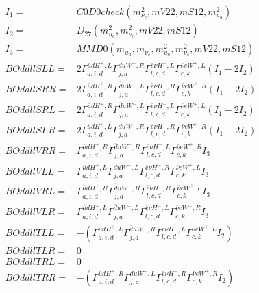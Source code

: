 \documentclass[A4,landscape]{article}
\begin{document}
\begin{align} 
I_1 = & C0D0check(m^2_{\nu_{{c}}}, mV22, mS12, m^2_{u_{{a}}}) \\ 
I_2 = & D_{27}(m^2_{u_{{a}}}, m^2_{\nu_{{c}}}, mV22, mS12) \\ 
I_3 = & MMD0(m_{u_{{a}}}, m_{\nu_{{c}}}, m^2_{u_{{a}}}, m^2_{\nu_{{c}}}, mV22, mS12) \\ 
  BOddllSLL= & 2  \Gamma^{\bar{u}d H^+,L}_{a, i, d} \Gamma^{\bar{d}u W^- ,R}_{j, a} \Gamma^{\bar{e}\nu H^- ,L}_{l, c, d} \Gamma^{\bar{\nu}e W^+,L}_{c, k} (I_1 - 2 I_2) \\ 
  BOddllSRR= & 2  \Gamma^{\bar{u}d H^+,R}_{a, i, d} \Gamma^{\bar{d}u W^- ,L}_{j, a} \Gamma^{\bar{e}\nu H^- ,R}_{l, c, d} \Gamma^{\bar{\nu}e W^+,R}_{c, k} (I_1 - 2 I_2) \\ 
  BOddllSRL= & 2  \Gamma^{\bar{u}d H^+,R}_{a, i, d} \Gamma^{\bar{d}u W^- ,L}_{j, a} \Gamma^{\bar{e}\nu H^- ,L}_{l, c, d} \Gamma^{\bar{\nu}e W^+,L}_{c, k} (I_1 - 2 I_2) \\ 
  BOddllSLR= & 2  \Gamma^{\bar{u}d H^+,L}_{a, i, d} \Gamma^{\bar{d}u W^- ,R}_{j, a} \Gamma^{\bar{e}\nu H^- ,R}_{l, c, d} \Gamma^{\bar{\nu}e W^+,R}_{c, k} (I_1 - 2 I_2) \\ 
  BOddllVRR= &  \Gamma^{\bar{u}d H^+,R}_{a, i, d} \Gamma^{\bar{d}u W^- ,R}_{j, a} \Gamma^{\bar{e}\nu H^- ,L}_{l, c, d} \Gamma^{\bar{\nu}e W^+,R}_{c, k} I_3 \\ 
  BOddllVLL= &  \Gamma^{\bar{u}d H^+,L}_{a, i, d} \Gamma^{\bar{d}u W^- ,L}_{j, a} \Gamma^{\bar{e}\nu H^- ,R}_{l, c, d} \Gamma^{\bar{\nu}e W^+,L}_{c, k} I_3 \\ 
  BOddllVRL= &  \Gamma^{\bar{u}d H^+,R}_{a, i, d} \Gamma^{\bar{d}u W^- ,R}_{j, a} \Gamma^{\bar{e}\nu H^- ,R}_{l, c, d} \Gamma^{\bar{\nu}e W^+,L}_{c, k} I_3 \\ 
  BOddllVLR= &  \Gamma^{\bar{u}d H^+,L}_{a, i, d} \Gamma^{\bar{d}u W^- ,L}_{j, a} \Gamma^{\bar{e}\nu H^- ,L}_{l, c, d} \Gamma^{\bar{\nu}e W^+,R}_{c, k} I_3 \\ 
  BOddllTLL= & -( \Gamma^{\bar{u}d H^+,L}_{a, i, d} \Gamma^{\bar{d}u W^- ,R}_{j, a} \Gamma^{\bar{e}\nu H^- ,L}_{l, c, d} \Gamma^{\bar{\nu}e W^+,L}_{c, k} I_2) \\ 
  BOddllTLR= & 0 \\ 
  BOddllTRL= & 0 \\ 
  BOddllTRR= & -( \Gamma^{\bar{u}d H^+,R}_{a, i, d} \Gamma^{\bar{d}u W^- ,L}_{j, a} \Gamma^{\bar{e}\nu H^- ,R}_{l, c, d} \Gamma^{\bar{\nu}e W^+,R}_{c, k} I_2) \\ 
\end{align} 
\end{document}
